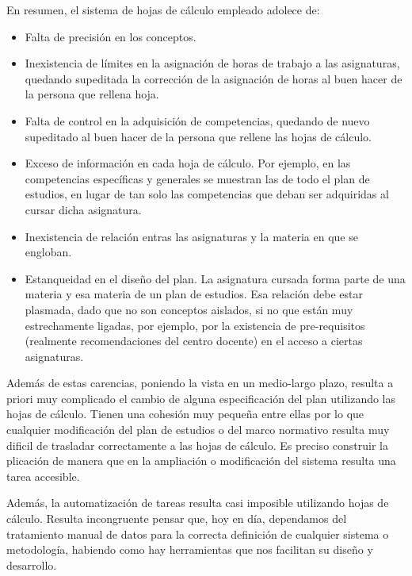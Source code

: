 		En resumen, el sistema de hojas de cálculo empleado adolece de:
		\begin{itemize}
			\item Falta de precisión en los conceptos.
			
			\item Inexistencia de límites en la asignación de horas de trabajo a las asignaturas, quedando supeditada la corrección de la asignación de horas al buen hacer de la persona que rellena hoja.
			
			\item Falta de control en la adquisición de competencias, quedando de nuevo supeditado al buen hacer de la persona que rellene las hojas de cálculo.

			\item Exceso de información en cada hoja de cálculo. Por ejemplo, en las competencias específicas y generales se muestran las de todo el plan de estudios, en lugar de tan solo las competencias que deban ser adquiridas al cursar dicha asignatura.

			\item Inexistencia de relación entras las asignaturas y la materia en que se engloban.

			\item Estanqueidad en el diseño del plan. La asignatura cursada forma parte de una materia y esa materia de un plan de estudios. Esa relación debe estar plasmada, dado que no son conceptos aislados, si no que están muy estrechamente ligadas, por ejemplo, por la existencia de pre-requisitos (realmente recomendaciones del centro docente) en el acceso a ciertas asignaturas.
	      \end{itemize}

		Además de estas carencias, poniendo la vista en un medio-largo plazo, resulta a priori muy complicado el cambio de alguna especificación del plan utilizando las hojas de cálculo. Tienen una cohesión muy pequeña entre ellas por lo que cualquier modificación del plan de estudios o del marco normativo resulta muy dificil de trasladar correctamente a las hojas de cálculo. Es preciso construir la plicación de manera que en la ampliación o modificación del sistema resulta una tarea accesible.
      
		Además, la automatización de tareas resulta casi imposible utilizando hojas de cálculo. Resulta incongruente pensar que, hoy en día, dependamos del tratamiento manual de datos para la correcta definición de cualquier sistema o metodología, habiendo como hay herramientas que nos facilitan su diseño y desarrollo.

